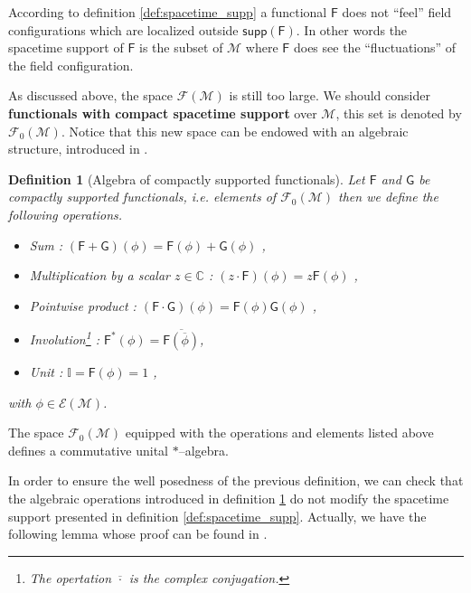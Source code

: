 \documentclass[11pt]{book}
\newcommand{\supp}{\mathsf{supp}}
\newcommand{\Ecal}{\mathcal{E}}
\newcommand{\Fcal}{\mathcal{F}}
\newcommand{\Mcal}{\mathcal{M}}
\newcommand{\Cbb}{\mathbb{C}}
\newcommand{\Ibb}{\mathbb{I}}
\newcommand{\Fsf}{\mathsf{F}}
\newcommand{\Gsf}{\mathsf{G}}
\theoremstyle{break}
\newtheorem{definition}{Definition}[chapter]
\begin{document}
\label{fig:sup_func}


According to definition \ref{def:spacetime_supp} a functional $\Fsf$ does not ``feel'' field configurations which are localized outside $\supp(\Fsf)$. In other words the spacetime support of $\Fsf$ is the subset of $\Mcal$ where $\Fsf$ does see the ``fluctuations'' of the field configuration.


As discussed above, the space $\Fcal(\Mcal)$ is still too large. We should consider \textbf{functionals with compact spacetime support} over $\Mcal$, this set is denoted by $\Fcal_0(\Mcal)$. Notice that this new space can be endowed with an algebraic structure, introduced in \cite{brunetti_algebraic_2012}.


\begin{definition}[Algebra of compactly supported functionals] \label{def:algebra_comp_supp_func}
Let $\Fsf$ and $\Gsf$ be compactly supported functionals, i.e. elements of $\Fcal_0(\Mcal)$ then we define the following operations.
%
\begin{itemize}
\item Sum : $(\Fsf+\Gsf)(\phi) = \Fsf(\phi) + \Gsf(\phi)$ ,
\item Multiplication by a scalar $z\in\Cbb$ : $(z \cdot \Fsf)(\phi) = z \Fsf(\phi)$ ,
\item Pointwise product : $(\Fsf \cdot \Gsf)(\phi) = \Fsf(\phi) \Gsf(\phi)$ ,
\item Involution\footnote{The opertation $\overline{\cdot}$ is the complex conjugation.} : $\Fsf^\ast(\phi) = \overline{\Fsf(\overline{\phi})}$,
\item Unit : $\Ibb = \Fsf(\phi) = 1$ ,
\end{itemize}
%
with $\phi \in \Ecal(\Mcal)$. 
\end{definition}


The space $\Fcal_0(\Mcal)$ equipped with the operations and elements listed above defines a commutative unital $\ast$--algebra.


In order to ensure the well posedness of the previous definition, we can check that the algebraic operations introduced in definition \ref{def:algebra_comp_supp_func} do not modify the spacetime support presented in definition \ref{def:spacetime_supp}. Actually, we have the following lemma whose proof can be found in  \cite{brunetti_algebraic_2012}.
\end{document}
